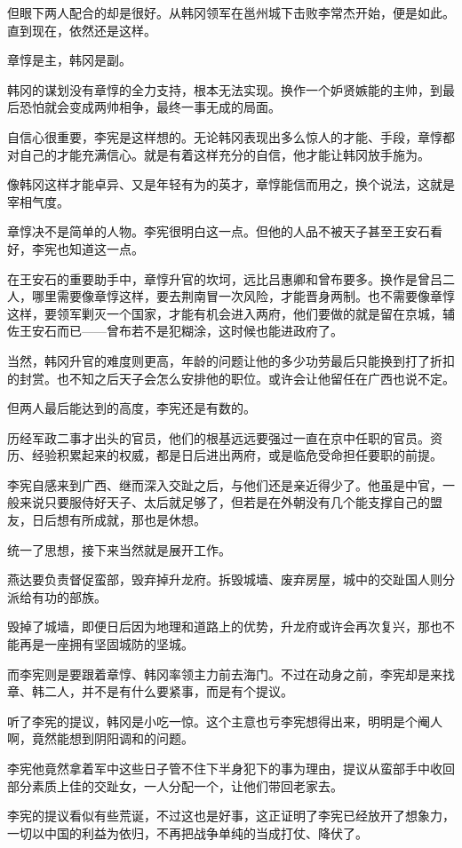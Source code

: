 但眼下两人配合的却是很好。从韩冈领军在邕州城下击败李常杰开始，便是如此。直到现在，依然还是这样。

章惇是主，韩冈是副。

韩冈的谋划没有章惇的全力支持，根本无法实现。换作一个妒贤嫉能的主帅，到最后恐怕就会变成两帅相争，最终一事无成的局面。

自信心很重要，李宪是这样想的。无论韩冈表现出多么惊人的才能、手段，章惇都对自己的才能充满信心。就是有着这样充分的自信，他才能让韩冈放手施为。

像韩冈这样才能卓异、又是年轻有为的英才，章惇能信而用之，换个说法，这就是宰相气度。

章惇决不是简单的人物。李宪很明白这一点。但他的人品不被天子甚至王安石看好，李宪也知道这一点。

在王安石的重要助手中，章惇升官的坎坷，远比吕惠卿和曾布要多。换作是曾吕二人，哪里需要像章惇这样，要去荆南冒一次风险，才能晋身两制。也不需要像章惇这样，要领军剿灭一个国家，才能有机会进入两府，他们要做的就是留在京城，辅佐王安石而已——曾布若不是犯糊涂，这时候也能进政府了。

当然，韩冈升官的难度则更高，年龄的问题让他的多少功劳最后只能换到打了折扣的封赏。也不知之后天子会怎么安排他的职位。或许会让他留任在广西也说不定。

但两人最后能达到的高度，李宪还是有数的。

历经军政二事才出头的官员，他们的根基远远要强过一直在京中任职的官员。资历、经验积累起来的权威，都是日后进出两府，或是临危受命担任要职的前提。

李宪自感来到广西、继而深入交趾之后，与他们还是亲近得少了。他虽是中官，一般来说只要服侍好天子、太后就足够了，但若是在外朝没有几个能支撑自己的盟友，日后想有所成就，那也是休想。

统一了思想，接下来当然就是展开工作。

燕达要负责督促蛮部，毁弃掉升龙府。拆毁城墙、废弃房屋，城中的交趾国人则分派给有功的部族。

毁掉了城墙，即便日后因为地理和道路上的优势，升龙府或许会再次复兴，那也不能再是一座拥有坚固城防的坚城。

而李宪则是要跟着章惇、韩冈率领主力前去海门。不过在动身之前，李宪却是来找章、韩二人，并不是有什么要紧事，而是有个提议。

听了李宪的提议，韩冈是小吃一惊。这个主意也亏李宪想得出来，明明是个阉人啊，竟然能想到阴阳调和的问题。

李宪他竟然拿着军中这些日子管不住下半身犯下的事为理由，提议从蛮部手中收回部分素质上佳的交趾女，一人分配一个，让他们带回老家去。

李宪的提议看似有些荒诞，不过这也是好事，这正证明了李宪已经放开了想象力，一切以中国的利益为依归，不再把战争单纯的当成打仗、降伏了。

